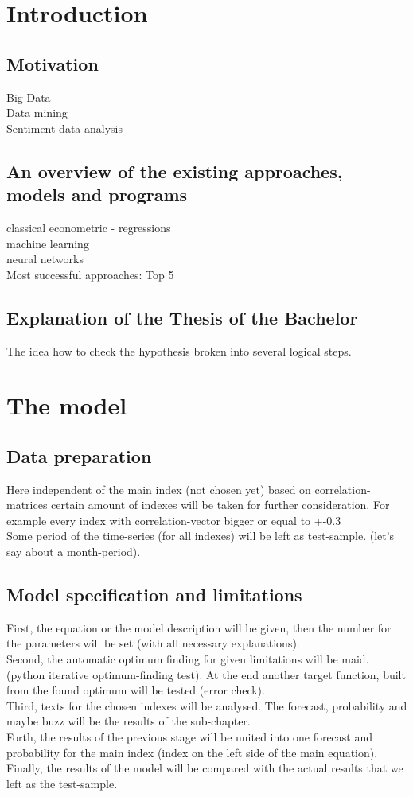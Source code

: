 \documentclass {article}
\begin{document}
\newpage
\section{Introduction}
\subsection{Motivation}
Big Data\\
Data mining\\
Sentiment data analysis
\subsection{An overview of the existing approaches, models and programs}
classical econometric - regressions\\

machine learning\\
neural networks\\
Most successful approaches: Top 5
\subsection{Explanation of the Thesis of the Bachelor}
The idea how to check the hypothesis broken into several logical steps.

\newpage
\section{The model}
\subsection{Data preparation}
Here independent of the main index (not chosen yet) based on correlation-matrices certain amount of indexes will be taken for further consideration. For example every index with correlation-vector bigger or equal to +-0.3\\
Some period of the time-series (for all indexes) will be left as test-sample. (let's say about a month-period).
\subsection{Model specification and limitations}
First, the equation or the model description will be given, then the number for the parameters will be set (with all necessary explanations).\\
Second, the automatic optimum finding for given limitations will be maid. (python iterative optimum-finding test). At the end another target function, built from the found optimum will be tested (error check).\\
Third, texts for the chosen indexes will be analysed. The forecast, probability and maybe buzz will be the results of the sub-chapter.\\
Forth, the results of the previous stage will be united into one forecast and probability for the main index (index on the left side of the main equation).\\
Finally, the results of the model will be compared with the actual results that we left as the test-sample.
\end{document}
